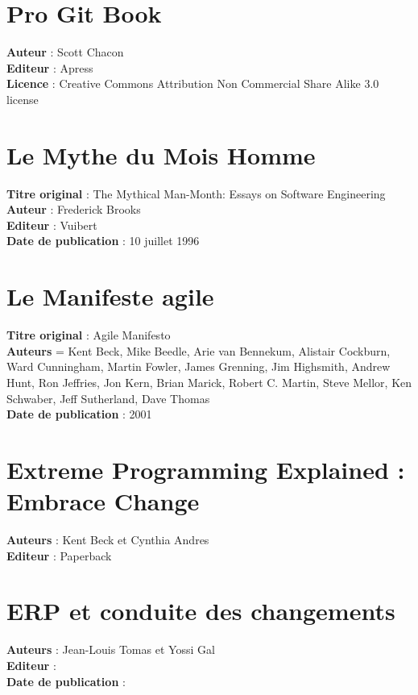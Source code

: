 
\section*{Pro Git Book}

\textbf{Auteur} : Scott Chacon \\
\textbf{Editeur} : Apress \\
\textbf{Licence} : Creative Commons Attribution Non Commercial Share Alike 3.0 license\\

\section*{Le Mythe du Mois Homme}

\textbf{Titre original} : The Mythical Man-Month: Essays on Software Engineering\\
\textbf{Auteur} : Frederick Brooks\\
\textbf{Editeur} : Vuibert \\
\textbf{Date de publication} : 10 juillet 1996 \\

\section*{Le Manifeste agile}

\textbf{Titre original} : Agile Manifesto\\
\textbf{Auteurs} = Kent Beck, Mike Beedle, Arie van Bennekum, Alistair Cockburn, Ward Cunningham, Martin Fowler, James Grenning, Jim Highsmith, Andrew Hunt, Ron Jeffries, Jon Kern, Brian Marick, Robert C. Martin, Steve Mellor, Ken Schwaber, Jeff Sutherland, Dave Thomas\\
\textbf{Date de publication} : 2001\\

\section*{Extreme Programming Explained : Embrace Change}

\textbf{Auteurs} : Kent Beck et Cynthia Andres\\
\textbf{Editeur} : Paperback\\

\section*{ERP et conduite des changements}

\textbf{Auteurs} : Jean-Louis Tomas et Yossi Gal\\
\textbf{Editeur} : \\
\textbf{Date de publication} : \\
